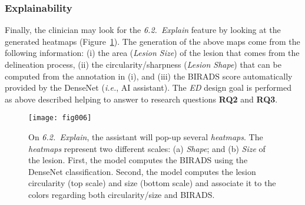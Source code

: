 \subsubsection{Explainability}

Finally, the clinician may look for the {\it 6.2.~Explain} feature  by looking at the generated heatmaps (Figure~\ref{fig:fig006}).
The generation of the above maps come from the following information: (i) the area ({\it Lesion Size}) of the lesion that comes from the delineation process, (ii) the circularity/sharpness ({\it Lesion Shape}) that can be computed from the annotation in (i), and (iii) the BIRADS score automatically provided by the DenseNet ({\it i.e.}, AI assistant).
The {\it ED} design goal is performed as above described helping to answer to research questions {\bf RQ2} and {\bf RQ3}.

\begin{figure}[htbp]
\centering
\texttt{[image: fig006]}
\caption{On {\it 6.2.~Explain}, the assistant will pop-up several {\it heatmaps}. The {\it heatmaps} represent two different scales: (a) {\it Shape}; and (b) {\it Size} of the lesion. First, the model computes the BIRADS using the DenseNet classification. Second, the model computes the lesion circularity (top scale) and size (bottom scale) and associate it to the colors regarding both circularity/size and BIRADS.}
\label{fig:fig006}
\end{figure}
